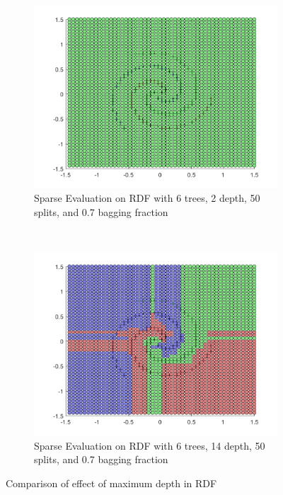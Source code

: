 \documentclass[a4paper, 10pt, conference]{ieeeconf}
\begin{document}
\begin{figure}[!ht]
  \captionsetup[subfigure]{position=b}
  \centering
    \begin{subfigure}{0.45\linewidth}
      \includegraphics[width=\textwidth]{img/tree_params/tree_sparse_6_2_50_7}
      \caption{Sparse Evaluation on RDF with 6 trees, 2 depth, 50 splits, and 0.7 bagging fraction}
      \label{fig:sparse_6_2_50_7}
    \end{subfigure}
    ~
    \begin{subfigure}{0.45\linewidth}
      \includegraphics[width=\textwidth]{img/tree_params/tree_sparse_6_14_50_7}
      \caption{Sparse Evaluation on RDF with 6 trees, 14 depth, 50 splits, and 0.7 bagging fraction}
      \label{fig:sparse_6_14_50_7}
    \end{subfigure}

  \caption{Comparison of effect of maximum depth in RDF}
  \label{fig:compare_depth}
\end{figure}
\end{document}
